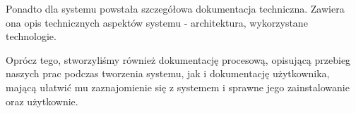 \documentclass[polish,12pt]{aghthesis}
\begin{document}
Ponadto dla systemu powstała szczegółowa dokumentacja techniczna. Zawiera ona opis
technicznych aspektów systemu - architektura, wykorzystane technologie.

Oprócz tego, stworzyliśmy również dokumentację procesową, opisującą przebieg naszych
prac podczas tworzenia systemu, jak i dokumentację użytkownika, mającą ułatwić mu 
zaznajomienie się z systemem i sprawne jego zainstalowanie oraz użytkownie. 


\nocite{artykul2011,ksiazka2011,narzedzie2011,projekt2011}


\end{document}
